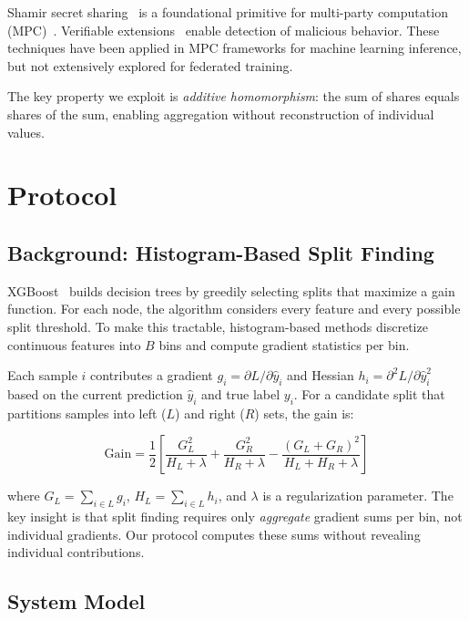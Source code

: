 \documentclass[journal,10pt]{IEEEtran}
\begin{document}
Shamir secret sharing~\cite{shamir1979} is a foundational primitive for multi-party computation (MPC)~\cite{benor1988}. Verifiable extensions~\cite{gennaro1998} enable detection of malicious behavior. These techniques have been applied in MPC frameworks for machine learning inference, but not extensively explored for federated training.

The key property we exploit is \textit{additive homomorphism}: the sum of shares equals shares of the sum, enabling aggregation without reconstruction of individual values.

\section{Protocol}

\subsection{Background: Histogram-Based Split Finding}

XGBoost~\cite{chen2016} builds decision trees by greedily selecting splits that maximize a gain function. For each node, the algorithm considers every feature and every possible split threshold. To make this tractable, histogram-based methods discretize continuous features into $B$ bins and compute gradient statistics per bin.

Each sample $i$ contributes a gradient $g_i = \partial L / \partial \hat{y}_i$ and Hessian $h_i = \partial^2 L / \partial \hat{y}_i^2$ based on the current prediction $\hat{y}_i$ and true label $y_i$. For a candidate split that partitions samples into left ($L$) and right ($R$) sets, the gain is:

\begin{equation}
  \text{Gain} = \frac{1}{2} \left[ \frac{G_L^2}{H_L + \lambda} + \frac{G_R^2}{H_R + \lambda} - \frac{(G_L + G_R)^2}{H_L + H_R + \lambda} \right]
\end{equation}

where $G_L = \sum_{i \in L} g_i$, $H_L = \sum_{i \in L} h_i$, and $\lambda$ is a regularization parameter. The key insight is that split finding requires only \textit{aggregate} gradient sums per bin, not individual gradients. Our protocol computes these sums without revealing individual contributions.

\subsection{System Model}
\end{document}
